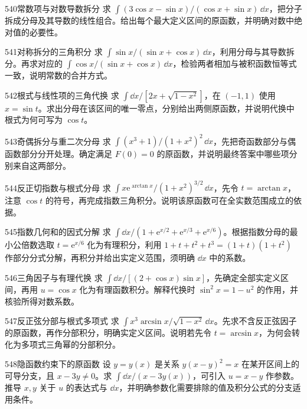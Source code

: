 \begin{exercise}{540}{常数项与对数导数拆分}
求 $\int(3\cos x-\sin x)/(\cos x+\sin x)\,\dd x$，把分子拆成分母及其导数的线性组合。给出每个最大定义区间的原函数，并明确对数中绝对值的必要性。
\end{exercise}
\begin{exercise}{541}{对称拆分的三角积分}
求 $\int\sin x/(\sin x+\cos x)\,\dd x$，利用分母与其导数拆分。再求对应的 $\int\cos x/(\sin x+\cos x)\,\dd x$，检验两者相加与被积函数恒等式一致，说明常数的合并方式。
\end{exercise}
\begin{exercise}{542}{根式与线性项的三角代换}
求 $\int\dd x/[2x+\sqrt{1-x^2}]$，在 $(-1,1)$ 使用 $x=\sin t$。求出分母在该区间的唯一零点，分别给出两侧原函数，并说明代换中根式为何可写为 $\cos t$。
\end{exercise}
\begin{exercise}{543}{奇偶拆分与重二次分母}
求 $\int(x^3+1)/(1+x^2)^2\,\dd x$，先把奇函数部分与偶函数部分分开处理。确定满足 $F(0)=0$ 的原函数，并说明最终答案中哪些项分别来自这两部分。
\end{exercise}
\begin{exercise}{544}{反正切指数与根式分母}
求 $\int x\mathrm e^{\arctan x}/(1+x^2)^{3/2}\,\dd x$，先令 $t=\arctan x$，注意 $\cos t$ 的符号，再完成指数三角积分。说明该原函数可在全实数范围成立的依据。
\end{exercise}
\begin{exercise}{545}{指数几何和的因式分解}
求 $\int\dd x/(1+\mathrm e^{x/2}+\mathrm e^{x/3}+\mathrm e^{x/6})$。根据指数分母的最小公倍数选取 $t=\mathrm e^{x/6}$ 化为有理积分，利用 $1+t+t^2+t^3=(1+t)(1+t^2)$ 作部分分式分解，再积分并给出实定义范围，须明确 $\dd x$ 中的系数。
\end{exercise}
\begin{exercise}{546}{三角因子与有理代换}
求 $\int\dd x/[(2+\cos x)\sin x]$，先确定全部实定义区间，再用 $u=\cos x$ 化为有理函数积分。解释代换时 $\sin^2x=1-u^2$ 的作用，并核验所得对数系数。
\end{exercise}
\begin{exercise}{547}{反正弦分部与根式多项式}
求 $\int x^3\arcsin x/\sqrt{1-x^2}\,\dd x$。先求不含反正弦因子的原函数，再作分部积分，明确实定义区间。说明若先令 $t=\arcsin x$，为何会转化为多项式三角幂的分部积分。
\end{exercise}
\begin{exercise}{548}{隐函数约束下的原函数}
设 $y=y(x)$ 是关系 $y(x-y)^2=x$ 在某开区间上的可导分支，且 $x-3y\ne0$。求 $\int\dd x/(x-3y(x))$，可引入 $u=x-y$ 作参数。推导 $x,y$ 关于 $u$ 的表达式与 $\dd x$，并明确参数化需要排除的值及积分公式的分支适用条件。
\end{exercise}
